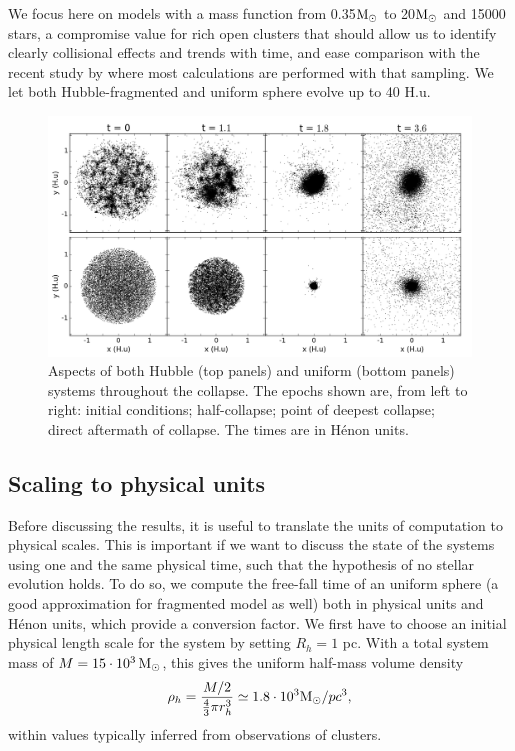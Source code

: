 We focus here on models with a mass function from 0.35${\textrm{M}_\odot}$ to 20${\textrm{M}_\odot}$ and 15000 stars, a compromise value for rich open clusters that should allow us to identify clearly collisional effects and trends with time, and ease comparison with the recent study by \cite{Caputo2014} where most calculations are performed with that sampling. We let both Hubble-fragmented and uniform sphere evolve up to 40 H.u. 





\begin{figure}
\begin{center}
\includegraphics[width=\textwidth]{Figures/3_collapse}
\caption[Stages of collapse for HL fragmented and uniform models]{Aspects of both Hubble (top panels) and uniform (bottom panels) systems throughout the collapse. The epochs shown are, from left to right: initial conditions; half-collapse; point of deepest collapse; direct aftermath of collapse. The times are in H\'enon units.}
\label{Fig:3_collapse}
\end{center}
\end{figure}


\subsection{Scaling to physical units}
\label{Sec:3_Scaling}
Before discussing the results, it is useful to translate the units of computation to physical scales. This is important if we want to discuss the state of the systems using one and the same physical time, such that the hypothesis of no stellar evolution holds.
To do so, we compute the free-fall time of an uniform sphere (a good approximation for fragmented model as well) both in physical units and H\'enon units, which provide a conversion factor. We first have to choose an initial physical length scale for the system by setting $R_h = 1$ pc. With a total system mass of $M = 15\cdot 10^3\, {\textrm{M}_\odot}$, this gives the uniform half-mass volume density 
\begin{equation}
\rho_h = \frac{M/2}{\frac{4}{3}\pi r_h^3}  \simeq 1.8 \cdot10^3 {\textrm{M}_\odot} / pc^3,
\end{equation}
within values typically inferred from observations of clusters.


